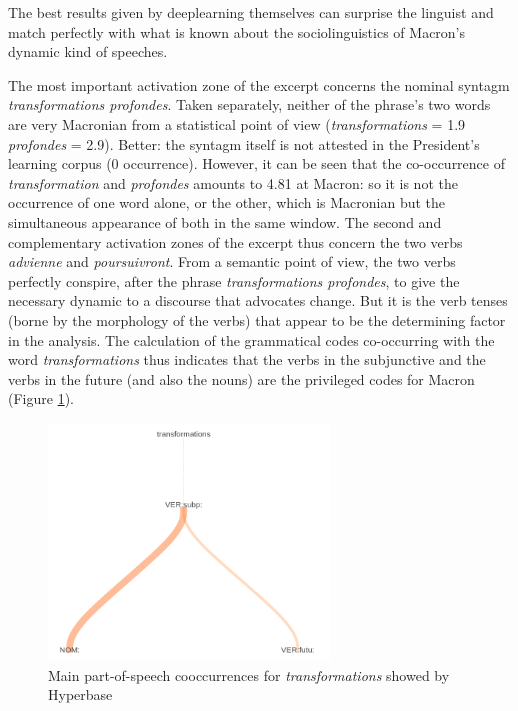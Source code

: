 The best results given by deeplearning themselves can surprise the linguist and match perfectly with what is known about the sociolinguistics of Macron's dynamic kind of speeches.

The most important activation zone of the excerpt concerns the nominal syntagm \textit{transformations profondes}. Taken separately, neither of the phrase's two words are very Macronian from a statistical point of view (\textit{transformations} = 1.9 \textit{profondes} = 2.9). Better: the syntagm itself is not attested in the President's learning corpus (0 occurrence). However, it can be seen that the co-occurrence of \textit{transformation} and \textit{profondes} amounts to 4.81 at Macron: so it is not the occurrence of one word alone, or the other, which is Macronian but the simultaneous appearance of both in the same window. The second and complementary activation zones of the excerpt thus concern the two verbs \textit{advienne} and \textit{poursuivront}. From a semantic point of view, the two verbs perfectly conspire, after the phrase \textit{transformations profondes}, to give the necessary dynamic to a discourse that advocates change. But it is the verb tenses (borne by the morphology of the verbs) that appear to be the determining factor in the analysis. The calculation of the grammatical codes co-occurring with the word \textit{transformations} thus indicates that the verbs in the subjunctive and the verbs in the future (and also the nouns) are the privileged codes for Macron (Figure \ref{macron}). 

\begin{figure}[h]
\begin{center}
\includegraphics[width=7.5cm]{img/macron_cooc.png}
\caption{Main part-of-speech cooccurrences for \textit{transformations} showed by Hyperbase}
\label{macron}
\end{center}
\end{figure}


